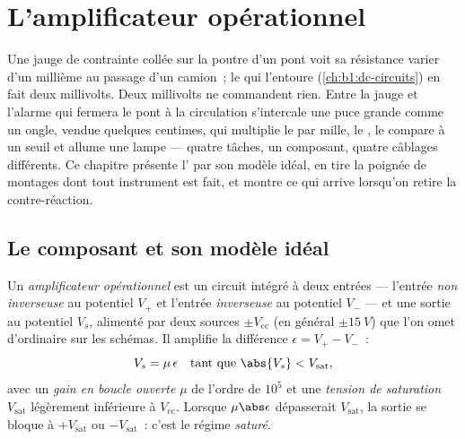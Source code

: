\chapter{L'amplificateur opérationnel}\label{ch:b1:operational-amplifier}

Une jauge de contrainte collée sur la poutre d'un pont voit sa
résistance varier d'un millième au passage d'un camion~; le  qui l'entoure (\cref{ch:b1:dc-circuits}) en fait deux
millivolts. Deux millivolts ne commandent rien. Entre la jauge et
l'alarme qui fermera le pont à la circulation s'intercale une puce
grande comme un ongle, vendue quelques centimes, qui multiplie le 
par mille, le , le compare à un seuil et allume une lampe ---
quatre tâches, un composant, quatre câblages différents. Ce chapitre
présente l' par son modèle idéal, en tire la
poignée de montages dont tout instrument est fait, et montre ce qui
arrive lorsqu'on retire la contre-réaction.

\section{Le composant et son modèle idéal}

\begin{definition}\label{def:b1:operational-amplifier:opamp}
Un \emph{amplificateur opérationnel} est un circuit intégré à deux
entrées --- l'entrée \emph{non inverseuse} au potentiel $V_+$ et
l'entrée \emph{inverseuse} au potentiel $V_-$ --- et une sortie au
potentiel $V_s$, alimenté par deux sources $\pm V_{\mathrm{cc}}$ (en
général $\pm\qty{15}{V}$) que l'on omet d'ordinaire sur les schémas. Il
amplifie la différence $\epsilon = V_+ - V_-$~:
\[
V_s = \mu\,\epsilon \quad\text{tant que } \abs{V_s} < V_{\mathrm{sat}},
\]
avec un \emph{gain en boucle ouverte} $\mu$ de l'ordre de $10^5$ et une
\emph{tension de saturation} $V_{\mathrm{sat}}$ légèrement inférieure à
$V_{\mathrm{cc}}$. Lorsque $\mu\abs\epsilon$ dépasserait
$V_{\mathrm{sat}}$, la sortie se bloque à $+V_{\mathrm{sat}}$ ou
$-V_{\mathrm{sat}}$~: c'est le régime \emph{saturé}.
\end{definition}

